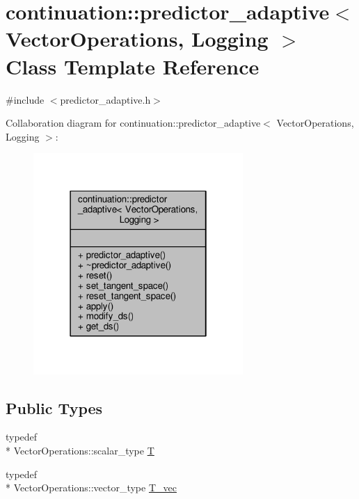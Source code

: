 \hypertarget{classcontinuation_1_1predictor__adaptive}{\section{continuation\-:\-:predictor\-\_\-adaptive$<$ Vector\-Operations, Logging $>$ Class Template Reference}
\label{classcontinuation_1_1predictor__adaptive}
}


{\ttfamily \#include $<$predictor\-\_\-adaptive.\-h$>$}



Collaboration diagram for continuation\-:\-:predictor\-\_\-adaptive$<$ Vector\-Operations, Logging $>$\-:
\nopagebreak
\begin{figure}[H]
\begin{center}
\leavevmode
\includegraphics[width=226pt]{classcontinuation_1_1predictor__adaptive__coll__graph}
\end{center}
\end{figure}
\subsection*{Public Types}
\begin{DoxyCompactItemize}
\item 
typedef \\*
Vector\-Operations\-::scalar\-\_\-type \hyperlink{classcontinuation_1_1predictor__adaptive_add46ad992055f6fad831be827ae49ddb}{T}
\item 
typedef \\*
Vector\-Operations\-::vector\-\_\-type \hyperlink{classcontinuation_1_1predictor__adaptive_ae84bcc7dd9cf2c85cd18bbb0de1c42b2}{T\-\_\-vec}
\end{DoxyCompactItemize}
